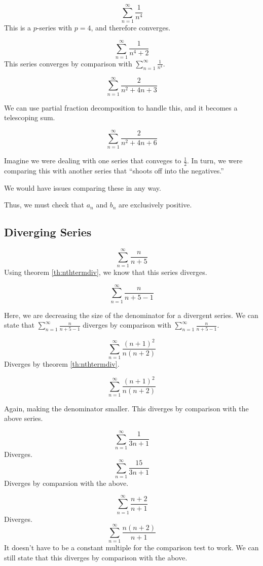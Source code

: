 \begin{ex}
  \[ \sum_{n=1}^{\infty} \frac{1}{n^4} \]
  This is a $p$-series with $p=4$, and therefore converges.

  \[ \sum_{n=1}^{\infty} \frac{1}{n^4+2} \]
  This series converges by comparison with $\sum_{n=1}^\infty \frac{1}{n^4}$.
\end{ex}
\begin{ex}
  \[ \sum_{n=1}^{\infty} \frac{2}{n^2+4n+3} \]
  \begin{note}
    We can use partial fraction decomposition to handle this, and it becomes a telescoping sum.
  \end{note}

  \[ \sum_{n=1}^{\infty} \frac{2}{n^2+4n+6} \]
\end{ex}

\begin{remark}
  Imagine we were dealing with one series that conveges to \( \frac{1}{2} \).
  In turn, we were comparing this with another series that ``shoots off into the negatives.''

  We would have issues comparing these in any way.

  Thus, we must check that \(a_n\) and \(b_n\) are exclusively positive.
\end{remark}

\subsection{Diverging Series}
\begin{ex}
  \[ \sum_{n=1}^{\infty} \frac{n}{n+5} \]
  Using theorem \ref{th:nthtermdiv}, we know that this series diverges.

  \[ \sum_{n=1}^{\infty} \frac{n}{n+5-1} \]

  Here, we are decreasing the size of the denominator for a divergent series.
  We can state that \( \sum_{n=1}^{\infty} \frac{n}{n+5-1} \) diverges by comparison with \( \sum_{n=1}^{\infty} \frac{n}{n+5-1} \).
\end{ex}
\begin{ex}
  \[ \sum_{n=1}^{\infty} \frac{(n+1)^2}{n(n+2)} \]
  Diverges by theorem \ref{th:nthtermdiv}.

  \[ \sum_{n=1}^{\infty} \frac{(n+1)^2}{n(n+2)} \]

  Again, making the denominator smaller. This diverges by comparison with the above series.
\end{ex}
\begin{ex}
  \[ \sum_{n=1}^{\infty} \frac{1}{3n+1} \]
  Diverges.
  \[ \sum_{n=1}^{\infty} \frac{15}{3n+1} \]
  Diverges by comparsion with the above.
\end{ex}
\begin{ex}
  \[ \sum_{n=1}^{\infty} \frac{n+2}{n+1} \]
  Diverges.
  \[ \sum_{n=1}^{\infty} \frac{n(n+2)}{n+1} \]
  It doesn't have to be a constant multiple for the comparison test to work.
  We can still state that this diverges by comparison with the above.
\end{ex}

